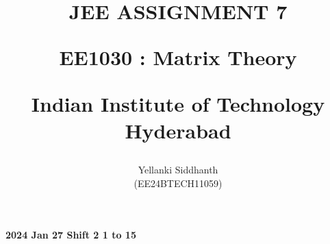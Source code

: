 \documentclass[journal]{IEEEtran}
\begin{document}

\onecolumn
\title{
JEE ASSIGNMENT 7

\large{EE1030 : Matrix Theory}

Indian Institute of Technology Hyderabad
}
\author{Yellanki Siddhanth

(EE24BTECH11059)
}	




\maketitle





\bigskip

\renewcommand{\thefigure}{\theenumi}
\renewcommand{\thetable}{\theenumi}
 
    
        \textbf{2024 Jan 27 Shift 2 1 to 15}
    
\end{document}
